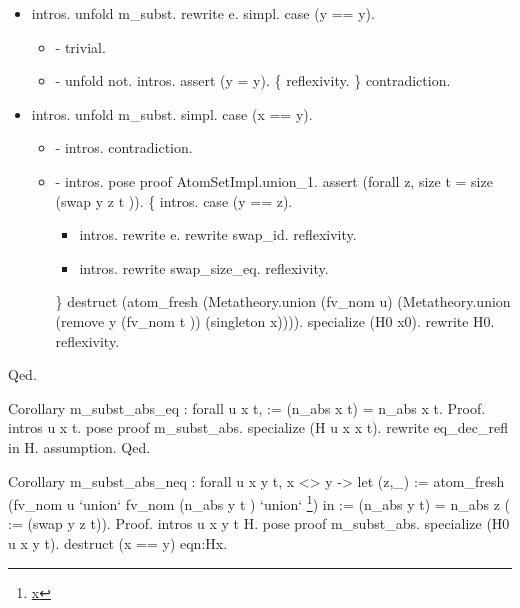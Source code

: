\begin{itemize}
\item  intros. unfold m\_subst.  rewrite e. simpl. case (y == y).

\begin{itemize}
\item - trivial.

\item - unfold not. intros. assert (y = y). \{
         reflexivity.
       \}
       contradiction.

\end{itemize}

\item  intros. unfold m\_subst. simpl. case (x == y).

\begin{itemize}
\item - intros. contradiction.

\item - intros. pose proof AtomSetImpl.union\_1.
       assert (forall z, size t  = size (swap y z t )). \{
         intros. case (y == z).

\begin{itemize}
\item  intros. rewrite e. rewrite swap\_id. reflexivity.

\item  intros. rewrite swap\_size\_eq. reflexivity.         

\end{itemize}
       \}
       destruct (atom\_fresh
       (Metatheory.union (fv\_nom u)
          (Metatheory.union (remove y (fv\_nom t )) (singleton x)))). 
       specialize (H0 x0). rewrite H0. reflexivity.

\end{itemize}

\end{itemize}
Qed.


Corollary m\_subst\_abs\_eq : forall u x t,  := (n\_abs x t) = n\_abs x t.
Proof.
  intros u x t.
  pose proof m\_subst\_abs. specialize (H u x x t). rewrite eq\_dec\_refl in H. assumption.
Qed.  


Corollary m\_subst\_abs\_neq : forall u x y t, x <> y -> let (z,\_) := atom\_fresh (fv\_nom u `union` fv\_nom (n\_abs y t ) `union` \footnote{\url{x}}) in  := (n\_abs y t) = n\_abs z ( := (swap y z t)).
Proof.
  intros u x y t H. pose proof m\_subst\_abs. specialize (H0 u x y t). destruct (x == y) eqn:Hx.


